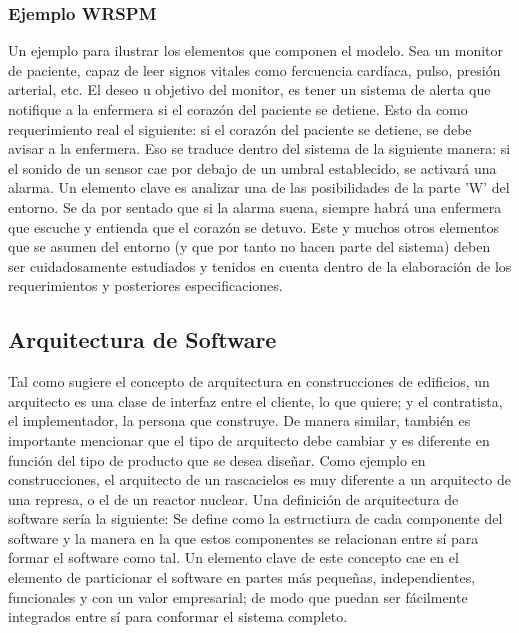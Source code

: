 \subsubsection{Ejemplo WRSPM} Un ejemplo para ilustrar los elementos que componen el modelo. Sea un monitor de paciente, capaz de leer signos vitales como fercuencia cardíaca, pulso, presión arterial, etc. El deseo u objetivo del monitor, es tener un sistema de alerta que notifique a la enfermera si el corazón del paciente se detiene. Esto da como requerimiento real el siguiente: si el corazón del paciente se detiene, se debe avisar a la enfermera. Eso se traduce dentro del sistema de la siguiente manera: si el sonido de un sensor cae por debajo de un umbral establecido, se activará una alarma. Un elemento clave es analizar una de las posibilidades de la parte 'W' del entorno. Se da por sentado que si la alarma suena, siempre habrá una enfermera que escuche y entienda que el corazón se detuvo. Este y muchos otros elementos que se asumen del entorno (y que por tanto no hacen parte del sistema) deben ser cuidadosamente estudiados y tenidos en cuenta dentro de la elaboración de los requerimientos y posteriores especificaciones.  

\subsection{Arquitectura de Software}
Tal como sugiere el concepto de arquitectura en construcciones de edificios, un arquitecto es una clase de interfaz entre el cliente, lo que quiere; y el contratista, el implementador, la persona que construye. De manera similar, también es importante mencionar que el tipo de arquitecto debe cambiar y es diferente en función del tipo de producto que se desea diseñar. Como ejemplo en construcciones, el arquitecto de un rascacielos es muy diferente a un arquitecto de una represa, o el de un reactor nuclear. Una definición de arquitectura de software sería la siguiente: Se define como la estructiura de cada componente del software y la manera en la que estos componentes se relacionan entre sí para formar el software como tal. Un elemento clave de este concepto cae en el elemento de particionar el software en partes más pequeñas, independientes, funcionales y con un valor empresarial; de modo que puedan ser fácilmente integrados entre sí para conformar el sistema completo. 

